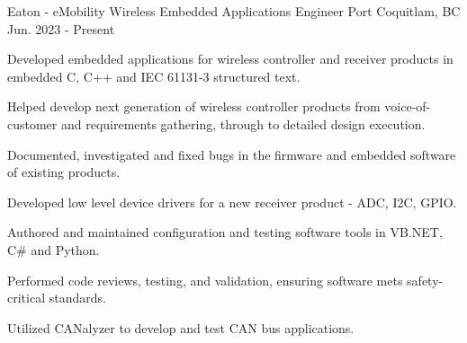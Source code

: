 


\begin{cventries}
    \cventry
    {Eaton - eMobility Wireless} %
    {Embedded Applications Engineer} %
    {Port Coquitlam, BC} %
    {Jun. 2023 - Present} %
    { %
        \begin{cvitems}
            \item {Developed embedded applications for wireless controller and receiver products in embedded C, C++ and IEC 61131-3 structured text.}
            \item {Helped develop next generation of wireless controller products from voice-of-customer and requirements gathering, through to detailed design execution.}
            \item {Documented, investigated and fixed bugs in the firmware and embedded software of existing products.}
            \item {Developed low level device drivers for a new receiver product - ADC, I2C, GPIO.}
            \item {Authored and maintained configuration and testing software tools in VB.NET, C\# and Python.}
            \item {Performed code reviews, testing, and validation, ensuring software mets safety-critical standards.}
            \item {Utilized CANalyzer to develop and test CAN bus applications. }
        \end{cvitems}
    }


\end{cventries}
